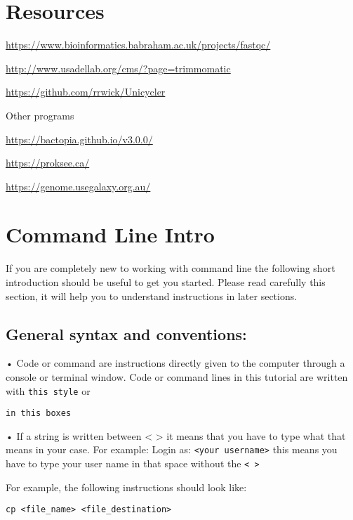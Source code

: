 \documentclass[
]{book}
\begin{document}
\hypertarget{resources}{%
\chapter{Resources}\label{resources}}

\url{https://www.bioinformatics.babraham.ac.uk/projects/fastqc/}

\url{http://www.usadellab.org/cms/?page=trimmomatic}

\url{https://github.com/rrwick/Unicycler}

Other programs

\url{https://bactopia.github.io/v3.0.0/}

\url{https://proksee.ca/}

\url{https://genome.usegalaxy.org.au/}

\hypertarget{command-line-intro}{%
\chapter{Command Line Intro}\label{command-line-intro}}

If you are completely new to working with command line the following short introduction should be useful to get you started. Please read carefully this section, it will help you to understand instructions in later sections.

\hypertarget{general-syntax-and-conventions}{%
\section{General syntax and conventions:}\label{general-syntax-and-conventions}}

• Code or command are instructions directly given to the computer through a console or terminal window. Code or command lines in this tutorial are written with \texttt{this\ style} or

\begin{verbatim}
in this boxes
\end{verbatim}

• If a string is written between \textless{} \textgreater{} it means that you have to type what that means in your case. For example: Login as: \texttt{\textless{}your\ username\textgreater{}} this means you have to type your user name in that space without the \texttt{\textless{}\ \textgreater{}}

For example, the following instructions should look like:

\begin{verbatim}
cp <file_name> <file_destination>
\end{verbatim}
\end{document}
